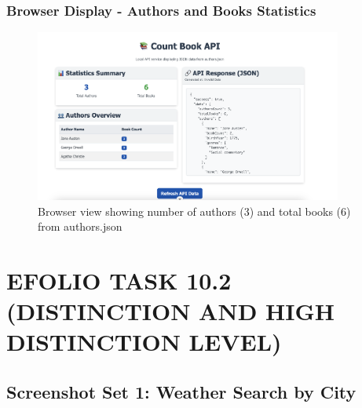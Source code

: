 \documentclass[12pt,a4paper]{article}
\begin{document}
\subsubsection{Browser Display - Authors and Books Statistics}
\begin{figure}[H]
\centering
\includegraphics[width=0.9\textwidth]{authors_books_count_browser.png}
\caption{Browser view showing number of authors (3) and total books (6) from authors.json}
\end{figure}

\newpage

\section{EFOLIO TASK 10.2 (DISTINCTION AND HIGH DISTINCTION LEVEL)}

\subsection{Screenshot Set 1: Weather Search by City}
\end{document}
